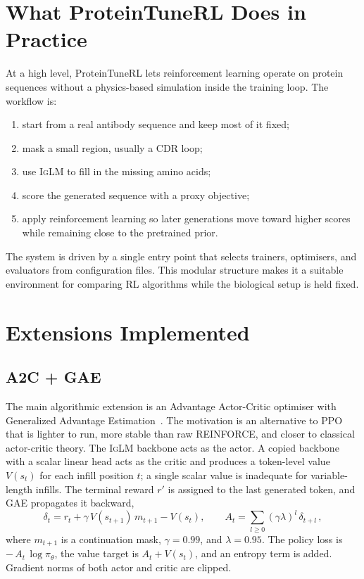 \documentclass[11pt]{article}
\newcommand{\iglm}{\textsc{IgLM}}
\begin{document}
\section{What ProteinTuneRL Does in Practice}
At a high level, ProteinTuneRL lets reinforcement learning operate on protein
sequences without a physics-based simulation inside the training loop. The
workflow is:
\begin{enumerate}[nosep]
  \item start from a real antibody sequence and keep most of it fixed;
  \item mask a small region, usually a CDR loop;
  \item use \iglm{} to fill in the missing amino acids;
  \item score the generated sequence with a proxy objective;
  \item apply reinforcement learning so later generations move toward higher
  scores while remaining close to the pretrained prior.
\end{enumerate}
The system is driven by a single entry point that selects trainers, optimisers,
and evaluators from configuration files. This modular structure makes it a
suitable environment for comparing RL algorithms while the biological setup is
held fixed.

\section{Extensions Implemented}
\subsection{A2C + GAE}
The main algorithmic extension is an Advantage Actor-Critic optimiser with
Generalized Advantage Estimation~\cite{gae}. The motivation is an alternative to
PPO that is lighter to run, more stable than raw REINFORCE, and closer to classical
actor-critic theory. The \iglm{} backbone acts as the actor. A copied backbone
with a scalar linear head acts as the critic and produces a token-level value
$V(s_t)$ for each infill position $t$; a single scalar value is inadequate for
variable-length infills. The terminal reward $r'$ is assigned to the last
generated token, and GAE propagates it backward,
\begin{equation}
  \delta_t = r_t + \gamma\,V(s_{t+1})\,m_{t+1} - V(s_t),
  \qquad
  A_t = \sum_{l\ge 0}(\gamma\lambda)^l\,\delta_{t+l}\,,
  \label{eq:gae}
\end{equation}
where $m_{t+1}$ is a continuation mask, $\gamma=0.99$, and $\lambda=0.95$. The
policy loss is $-\,A_t\,\log\pi_\theta$, the value target is $A_t+V(s_t)$, and an
entropy term is added. Gradient norms of both actor and critic are clipped.
\end{document}
